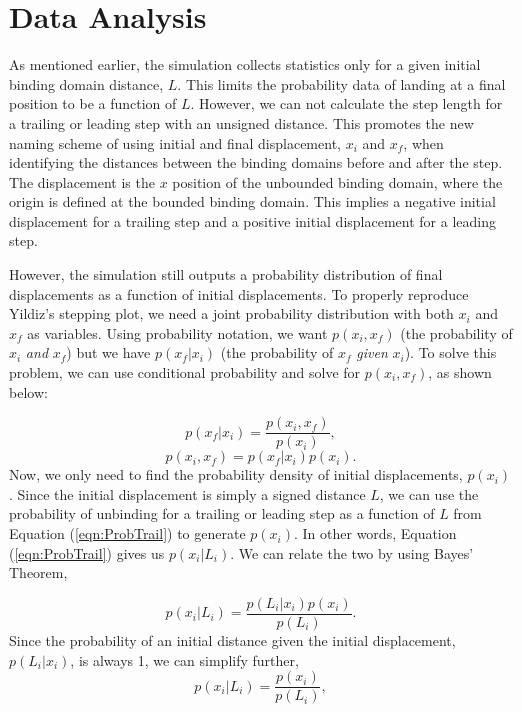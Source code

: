 \section{Data Analysis} \label{sec:DataAna}
As mentioned earlier, the simulation collects statistics only for a given initial binding domain distance, $L$. This limits the probability data of landing at a final position to be a function of $L$. However, we can not calculate the step length for a trailing or leading step with an unsigned distance. This promotes the new naming scheme of using initial and final displacement, $x_i$ and $x_f$, when identifying the distances between the binding domains before and after the step. The displacement is the $x$ position of the unbounded binding domain, where the origin is defined at the bounded binding domain. This implies a negative initial displacement for a trailing step and a positive initial displacement for a leading step. 

However, the simulation still outputs a probability distribution of final displacements as a function of initial displacements. To properly reproduce Yildiz's stepping plot, we need a joint probability distribution with both $x_i$ and $x_f$ as variables. Using probability notation, we want $p(x_i,x_f)$ (the probability of $x_i$ \textit{and} $x_f$) but we have $p(x_f|x_i)$ (the probability of $x_f$ \textit{given} $x_i$). To solve this problem, we can use conditional probability and solve for $p(x_i,x_f)$, as shown below:


\[
	p(x_f|x_i)=\frac{p(x_i,x_f)}{p(x_i)},
\]
\begin{equation}
	p(x_i,x_f)=p(x_f|x_i)p(x_i).
\end{equation}
Now, we only need to find the probability density of initial displacements, $p(x_i)$. Since the initial displacement is simply a signed distance $L$, we can use the probability of unbinding for a trailing or leading step as a function of $L$ from Equation (\ref{eqn:ProbTrail}) to generate $p(x_i)$. In other words, Equation (\ref{eqn:ProbTrail}) gives us $p(x_i|L_i)$. We can relate the two by using Bayes' Theorem,

\begin{equation}
	p(x_i|L_i)=\frac{p(L_i|x_i)p(x_i)}{p(L_i)}.
\end{equation}
Since the probability of an initial distance given the initial displacement, $p(L_i|x_i)$, is always 1, we can simplify further,
\[
	p(x_i|L_i)=\frac{p(x_i)}{p(L_i)},
\]

